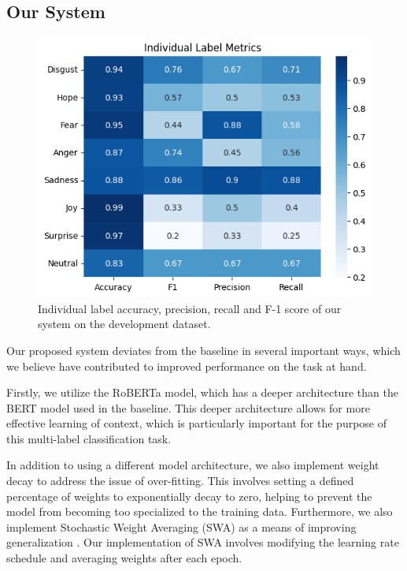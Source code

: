 \documentclass[11pt]{article}
\begin{document}
\subsection{Our System}

\begin{figure}[bhp]
\includegraphics[width=\columnwidth]{roberta_metrics_emo.png}
\caption{Individual label accuracy, precision, recall and F-1 score of our system on the development dataset.}
\label{fig:roberta_metrics}
\end{figure}

Our proposed system deviates from the baseline in several important ways, which we believe have contributed to improved performance on the task at hand.

Firstly, we utilize the RoBERTa model, which has a deeper architecture than the BERT model used in the baseline. This deeper architecture allows for more effective learning of context, which is particularly important for the purpose of this multi-label classification task.

In addition to using a different model architecture, we also implement weight decay to address the issue of over-fitting. This involves setting a defined percentage of weights to exponentially decay to zero, helping to prevent the model from becoming too specialized to the training data. Furthermore, we also implement Stochastic Weight Averaging (SWA) as a means of improving generalization \citep{izmailov2019averaging}. Our implementation of SWA involves modifying the learning rate schedule and averaging weights after each epoch.
\end{document}
